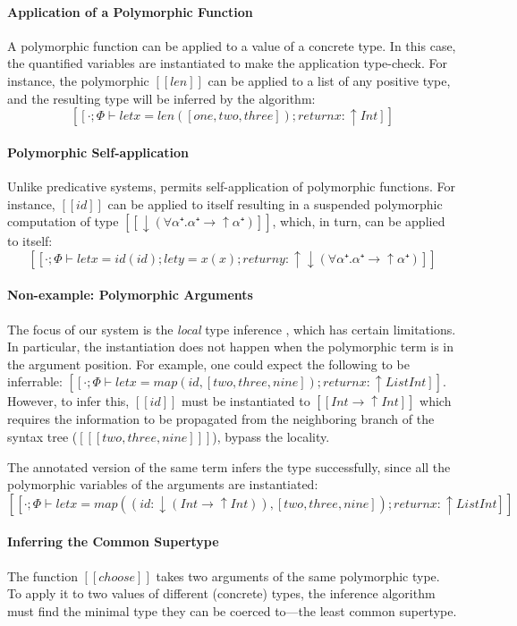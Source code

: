 \paragraph{Application of a Polymorphic Function}
  A polymorphic function can be applied to a value of a concrete type. In this
  case, the quantified variables are instantiated to make the application
  type-check. For instance, the polymorphic $[[len]]$ can be applied to a list
  of any positive type, and the resulting type will be inferred by the
  algorithm:
  $$[[· ; Φ ⊢ let x = len([one,two,three]); return x : ↑Int]]$$


\paragraph{Polymorphic Self-application}
  Unlike predicative systems, \fexists permits self-application of polymorphic
  functions. For instance, $[[id]]$ can be applied to itself resulting in a
  suspended polymorphic computation of type $[[↓(∀α⁺.α⁺ → ↑α⁺)]]$, which, in
  turn, can be applied to itself:
  $$[[· ; Φ ⊢ let x = id(id); let y = x(x); return y : ↑↓(∀α⁺.α⁺ → ↑α⁺)]]$$


\paragraph{Non-example: Polymorphic Arguments}
The focus of our system is the \emph{local} type inference
\cite{pierce2000:local}, which has certain limitations. In particular, the
instantiation does not happen when the polymorphic term is in the argument
position. For example, one could expect the following to be inferrable:
\mbox{$[[· ; Φ ⊢ let x = map(id, [two, three, nine]); return x : ↑ List Int]]$}.
However, to infer this, $[[id]]$ must be instantiated to \mbox{$[[Int → ↑Int]]$}
which requires the information to be propagated from the neighboring branch of
the syntax tree (\mbox{$[[ [two, three, nine] ]]$}), \ie bypass the locality. 

The annotated version of the same term infers the type successfully, 
since all the polymorphic variables of the arguments are instantiated:
$$[[· ; Φ ⊢ let x = map((id : ↓(Int → ↑Int)), [two, three, nine]); return x : ↑ List Int]]$$

\paragraph{Inferring the Common Supertype}
  The function $[[choose]]$ takes two arguments of the same
  polymorphic type. To apply it to two values of different (concrete) types, 
  the inference algorithm must find the minimal type they can be coerced 
  to---the least common supertype.

